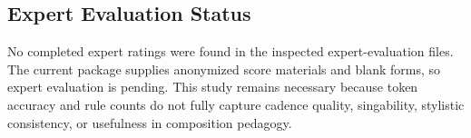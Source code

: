 \subsection{Expert Evaluation Status}

No completed expert ratings were found in the inspected expert-evaluation files. The current package supplies anonymized score materials and blank forms, so expert evaluation is pending. This study remains necessary because token accuracy and rule counts do not fully capture cadence quality, singability, stylistic consistency, or usefulness in composition pedagogy.


